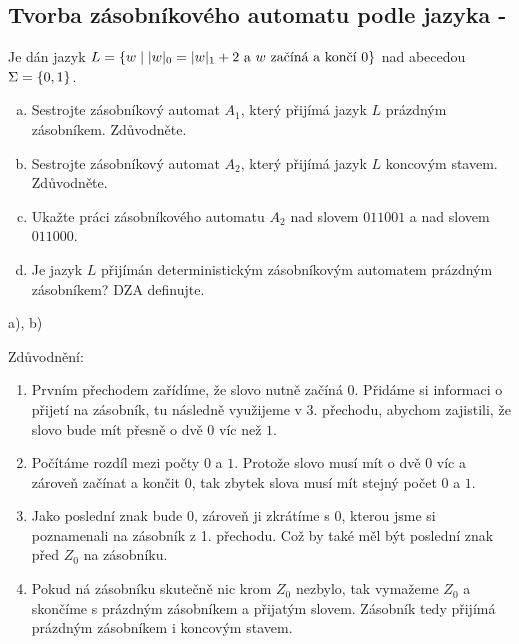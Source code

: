 \subsection{Tvorba zásobníkového automatu podle jazyka - }
Je dán jazyk $L = \left\lbrace w \mid |w|_0 = |w|_1 + 2 \text{ a } w \text{ začíná a končí } 0 \right\rbrace$ nad abecedou $\Sigma = \left\lbrace 0,1 \right\rbrace$.

\begin{enumerate}[a), noitemsep]
    \item Sestrojte zásobníkový automat $A_1$, který přijímá jazyk $L$ prázdným zásobníkem. Zdůvodněte.  
    \item Sestrojte zásobníkový automat $A_2$, který přijímá jazyk $L$ koncovým stavem. Zdůvodněte. 
    \item Ukažte práci zásobníkového automatu $A_2$ nad slovem $011001$ a nad slovem $011000$. 
    \item Je jazyk $L$ přijímán deterministickým zásobníkovým automatem prázdným zásobníkem? DZA definujte.
\end{enumerate}

a), b)


Zdůvodnění: 
\begin{enumerate}[noitemsep]
    \item Prvním přechodem zařídíme, že slovo nutně začíná $0$. Přidáme si informaci o přijetí na zásobník, tu následně 
    využijeme v 3. přechodu, abychom zajistili, že slovo bude mít přesně o dvě $0$ víc než $1$.
    \item Počítáme rozdíl mezi počty $0$ a $1$. Protože slovo musí mít o dvě $0$ víc a zároveň začínat a končit $0$, tak
    zbytek slova musí mít stejný počet $0$ a $1$.
    \item Jako poslední znak bude $0$, zároveň ji zkrátíme s $0$, kterou jsme si poznamenali na zásobník z 1. přechodu. 
    Což by také měl být poslední znak před $Z_0$ na zásobníku.
    \item Pokud ná zásobníku skutečně nic krom $Z_0$ nezbylo, tak vymažeme $Z_0$ a skončíme s prázdným zásobníkem a 
    přijatým slovem. Zásobník tedy přijímá prázdným zásobníkem i koncovým stavem.
\end{enumerate}

